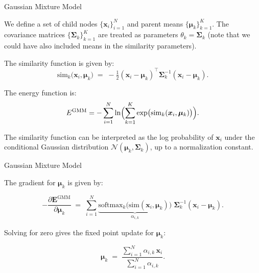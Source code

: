 \documentclass{beamer}
\begin{document}
\begin{frame}{Gaussian Mixture Model}

    We define a set of child nodes \(\{\bm{x}_i\}_{i=1}^N\) and parent means \(\{\bm{\mu}_k\}_{k=1}^K\). The covariance matrices \(\{\bm{\Sigma}_k\}_{k=1}^K\) are treated as parameters \(\theta_k = \bm{\Sigma}_k\) (note that we could have also included means in the similarity parameters).
    
    \bigskip
    
    The similarity function is given by:
    \[
    \mathrm{sim}_k\bigl(\bm{x}_i,\bm{\mu}_k\bigr)
    \;=\;
    -\tfrac{1}{2}
    (\bm{x}_i - \bm{\mu}_k)^\top \bm{\Sigma}_k^{-1}(\bm{x}_i - \bm{\mu}_k).
    \]
    
    The energy function is:
    \[
    E^{\mathrm{GMM}}
    =
    -\sum_{i=1}^N
    \ln \Bigl(\sum_{k=1}^K
    \exp\bigl(\mathrm{sim}_k(\bm{x}_i,\bm{\mu}_k)\bigr)\Bigr).
    \]

    The similarity function can be interpreted as the log probability of \(\bm{x}_i\) under the conditional Gaussian distribution \(\mathcal{N}(\bm{\mu}_k, \bm{\Sigma}_k)\), up to a normalization constant.

\end{frame}

    

\begin{frame}{Gaussian Mixture Model}

The gradient for $\bm{\mu}_k$ is given by:

\[
-\frac{\partial \bm{E}^{\mathrm{GMM}}}{\partial \bm{\mu}_k}
\;=\;
\sum_{i=1}^N 
\underbrace{\mathrm{softmax}_{k} \bigl(\mathrm{sim}(\bm{x}_i,\bm{\mu}_k)\bigr)}_{\alpha_{i,k}}
\;\bm{\Sigma}_k^{-1}(\bm{x}_i - \bm{\mu}_k).
\]

Solving for zero gives the fixed point update for \(\bm{\mu}_k\):

\[
\bm{\mu}_k
\;=\;
\frac{\sum_{i=1}^N \alpha_{i,k}\,\bm{x}_i}
     {\sum_{i=1}^N \alpha_{i,k}}.
\]
\end{frame}




    
\end{document}
